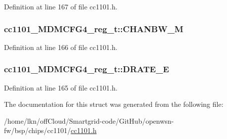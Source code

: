 Definition at line 167 of file cc1101.\+h.

\subsubsection[{\texorpdfstring{C\+H\+A\+N\+B\+W\+\_\+M}{CHANBW_M}}]{ cc1101\+\_\+\+M\+D\+M\+C\+F\+G4\+\_\+reg\+\_\+t\+::\+C\+H\+A\+N\+B\+W\+\_\+M}\hypertarget{structcc1101___m_d_m_c_f_g4__reg__t_a2c4b53c73a287d6e31f828c18d25f858}{}\label{structcc1101___m_d_m_c_f_g4__reg__t_a2c4b53c73a287d6e31f828c18d25f858}


Definition at line 166 of file cc1101.\+h.

\subsubsection[{\texorpdfstring{D\+R\+A\+T\+E\+\_\+E}{DRATE_E}}]{ cc1101\+\_\+\+M\+D\+M\+C\+F\+G4\+\_\+reg\+\_\+t\+::\+D\+R\+A\+T\+E\+\_\+E}\hypertarget{structcc1101___m_d_m_c_f_g4__reg__t_acb6eb867bce3fcecb9a11f6900de55cb}{}\label{structcc1101___m_d_m_c_f_g4__reg__t_acb6eb867bce3fcecb9a11f6900de55cb}


Definition at line 165 of file cc1101.\+h.



The documentation for this struct was generated from the following file\+:\begin{DoxyCompactItemize}
\item 
/home/lkn/off\+Cloud/\+Smartgrid-\/code/\+Git\+Hub/openwsn-\/fw/bsp/chips/cc1101/\hyperlink{cc1101_8h}{cc1101.\+h}\end{DoxyCompactItemize}
